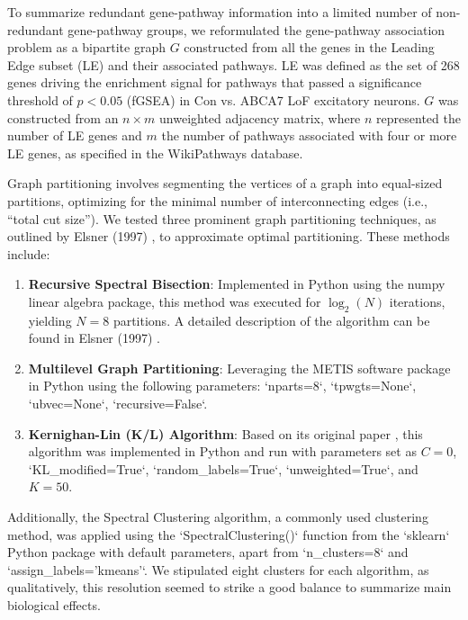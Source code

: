 \documentclass[12pt]{article}
\begin{document}
To summarize redundant gene-pathway information into a limited number of non-redundant gene-pathway groups, we reformulated the gene-pathway association problem as a bipartite graph $G$ constructed from all the genes in the Leading Edge subset (LE) and their associated pathways. LE was defined as the set of 268 genes driving the enrichment signal for pathways that passed a significance threshold of $p < 0.05$ (fGSEA) in Con vs. ABCA7 LoF excitatory neurons. $G$ was constructed from an $n \times m$ unweighted adjacency matrix, where $n$ represented the number of LE genes and $m$ the number of pathways associated with four or more LE genes, as specified in the WikiPathways database.

Graph partitioning involves segmenting the vertices of a graph into equal-sized partitions, optimizing for the minimal number of interconnecting edges (i.e., “total cut size”). We tested three prominent graph partitioning techniques, as outlined by Elsner (1997) \cite{Elsner1997GraphPartitioning}, to approximate optimal partitioning. These methods include:

\begin{enumerate}
    \item \textbf{Recursive Spectral Bisection}: Implemented in Python using the numpy linear algebra package, this method was executed for $\log_2(N)$ iterations, yielding $N = 8$ partitions. A detailed description of the algorithm can be found in Elsner (1997) \cite{Elsner1997GraphPartitioning}.
    \item \textbf{Multilevel Graph Partitioning}: Leveraging the METIS software package \cite{Karypis1997METIS} in Python using the following parameters: `nparts=8`, `tpwgts=None`, `ubvec=None`, `recursive=False`.
    \item \textbf{Kernighan-Lin (K/L) Algorithm}: Based on its original paper \cite{Kernighan1970-zl}, this algorithm was implemented in Python and run with parameters set as $C=0$, `KL\_modified=True`, `random\_labels=True`, `unweighted=True`, and $K=50$.
\end{enumerate}

Additionally, the Spectral Clustering algorithm, a commonly used clustering method, was applied using the `SpectralClustering()` function from the `sklearn` Python package with default parameters, apart from `n\_clusters=8` and `assign\_labels='kmeans'`. We stipulated eight clusters for each algorithm, as qualitatively, this resolution seemed to strike a good balance to summarize main biological effects.
\end{document}
